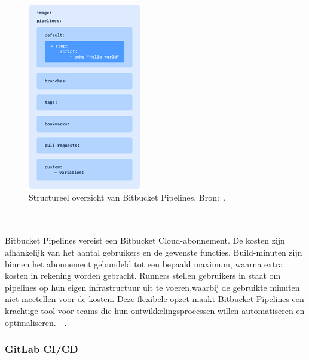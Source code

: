 \begin{figure}[H]
    \centering
    \includegraphics[width=0.3\linewidth]{Foto's/yml-structure.png}
    \caption{Structureel overzicht van Bitbucket Pipelines. Bron:~\autocite{atlassianConfigure}.}
    \label{fig:Structureel-overzicht}
\end{figure}
\\\\
Bitbucket Pipelines vereist een Bitbucket Cloud-abonnement. De kosten zijn afhankelijk van het aantal gebruikers en de gewenste functies. Build-minuten zijn binnen het abonnement gebundeld tot een bepaald maximum, waarna extra kosten in rekening worden gebracht. Runners stellen gebruikers in staat om pipelines op hun eigen infrastructuur uit te voeren,waarbij de gebruikte minuten niet meetellen voor de kosten. Deze flexibele opzet maakt Bitbucket Pipelines een krachtige tool voor teams die hun ontwikkelingsprocessen willen automatiseren en optimaliseren.~\autocite{atlassianBambooSpecs}~\autocite{atlassianPricing}.

\newpage
\subsubsection{GitLab CI/CD}


